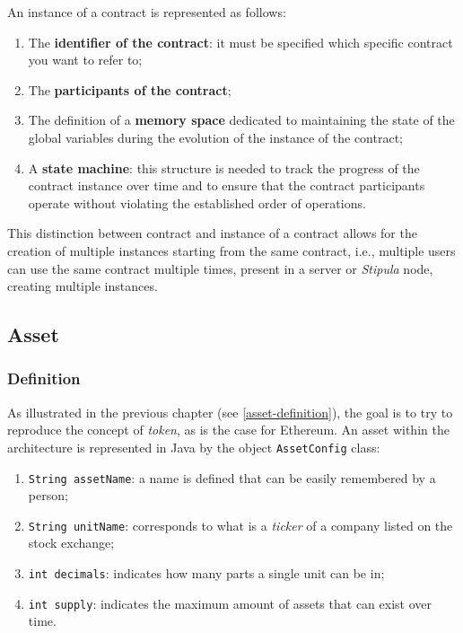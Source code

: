 An instance of a contract is represented as follows:
\begin{enumerate}
   \item The \textbf{identifier of the contract}: it must be specified which specific contract you want 
   to refer to;
   \item The \textbf{participants of the contract};
   \item The definition of a \textbf{memory space} dedicated to maintaining the state of the global 
   variables during the evolution of the instance of the contract;
   \item A \textbf{state machine}: this structure is needed to track the progress of the contract 
   instance over time and to ensure that the contract participants operate without violating the 
   established order of operations.
\end{enumerate}

This distinction between contract and instance of a contract allows for the creation of multiple instances 
starting from the same contract, i.e., multiple users can use the same contract multiple times, present in 
a server or \textit{Stipula} node, creating multiple instances.

\subsection{Asset}

\subsubsection{Definition}
\label{asset-implementation}

As illustrated in the previous chapter (see \ref{asset-definition}), the goal is to try to reproduce the 
concept of \textit{token}, as is the case for Ethereum. An asset within the architecture is represented 
in Java by the object \verb|AssetConfig| class:
\begin{enumerate}
\item \verb|String assetName|: a name is defined that can be easily remembered by a person;
\item \verb|String unitName|: corresponds to what is a \textit{ticker} of a company listed on the stock 
exchange;
\item \verb|int decimals|: indicates how many parts a single unit can be in;
\item \verb|int supply|: indicates the maximum amount of assets that can exist over time.
\end{enumerate}

